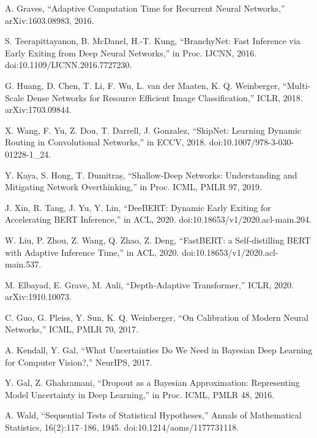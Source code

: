 \begin{thebibliography}{99}

A. Graves, ``Adaptive Computation Time for Recurrent Neural Networks,'' arXiv:1603.08983, 2016.

S. Teerapittayanon, B. McDanel, H.-T. Kung, ``BranchyNet: Fast Inference via Early Exiting from Deep Neural Networks,'' in Proc. IJCNN, 2016. doi:10.1109/IJCNN.2016.7727230.

G. Huang, D. Chen, T. Li, F. Wu, L. van der Maaten, K. Q. Weinberger, ``Multi-Scale Dense Networks for Resource Efficient Image Classification,'' ICLR, 2018. arXiv:1703.09844.

X. Wang, F. Yu, Z. Dou, T. Darrell, J. Gonzalez, ``SkipNet: Learning Dynamic Routing in Convolutional Networks,'' in ECCV, 2018. doi:10.1007/978-3-030-01228-1\_24.

Y. Kaya, S. Hong, T. Dumitraș, ``Shallow-Deep Networks: Understanding and Mitigating Network Overthinking,'' in Proc. ICML, PMLR 97, 2019.

J. Xin, R. Tang, J. Yu, Y. Lin, ``DeeBERT: Dynamic Early Exiting for Accelerating BERT Inference,'' in ACL, 2020. doi:10.18653/v1/2020.acl-main.204.

W. Liu, P. Zhou, Z. Wang, Q. Zhao, Z. Deng, ``FastBERT: a Self-distilling BERT with Adaptive Inference Time,'' in ACL, 2020. doi:10.18653/v1/2020.acl-main.537.

M. Elbayad, E. Grave, M. Auli, ``Depth-Adaptive Transformer,'' ICLR, 2020. arXiv:1910.10073.

C. Guo, G. Pleiss, Y. Sun, K. Q. Weinberger, ``On Calibration of Modern Neural Networks,'' ICML, PMLR 70, 2017.

A. Kendall, Y. Gal, ``What Uncertainties Do We Need in Bayesian Deep Learning for Computer Vision?,'' NeurIPS, 2017.

Y. Gal, Z. Ghahramani, ``Dropout as a Bayesian Approximation: Representing Model Uncertainty in Deep Learning,'' in Proc. ICML, PMLR 48, 2016.

A. Wald, ``Sequential Tests of Statistical Hypotheses,'' Annals of Mathematical Statistics, 16(2):117--186, 1945. doi:10.1214/aoms/1177731118.


\end{thebibliography}
